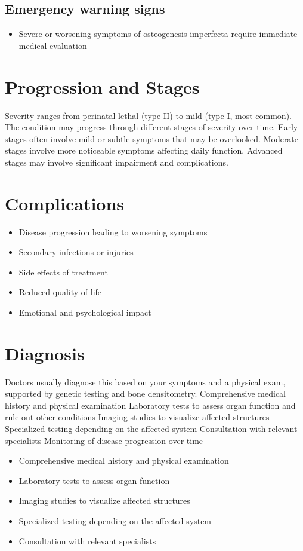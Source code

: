 \subsection{Emergency warning signs}
\begin{itemize}[noitemsep]
  \item Severe or worsening symptoms of osteogenesis imperfecta require immediate medical evaluation
\end{itemize}
\section{Progression and Stages}
Severity ranges from perinatal lethal (type II) to mild (type I, most common). The condition may progress through different stages of severity over time. Early stages often involve mild or subtle symptoms that may be overlooked. Moderate stages involve more noticeable symptoms affecting daily function. Advanced stages may involve significant impairment and complications.
\section{Complications}
\begin{itemize}[noitemsep]
  \item Disease progression leading to worsening symptoms
  \item Secondary infections or injuries
  \item Side effects of treatment
  \item Reduced quality of life
  \item Emotional and psychological impact
\end{itemize}
\section{Diagnosis}
Doctors usually diagnose this based on your symptoms and a physical exam, supported by genetic testing and bone densitometry. Comprehensive medical history and physical examination Laboratory tests to assess organ function and rule out other conditions Imaging studies to visualize affected structures Specialized testing depending on the affected system Consultation with relevant specialists Monitoring of disease progression over time

\begin{itemize}[noitemsep]
  \item Comprehensive medical history and physical examination
  \item Laboratory tests to assess organ function
  \item Imaging studies to visualize affected structures
  \item Specialized testing depending on the affected system
  \item Consultation with relevant specialists
\end{itemize}
